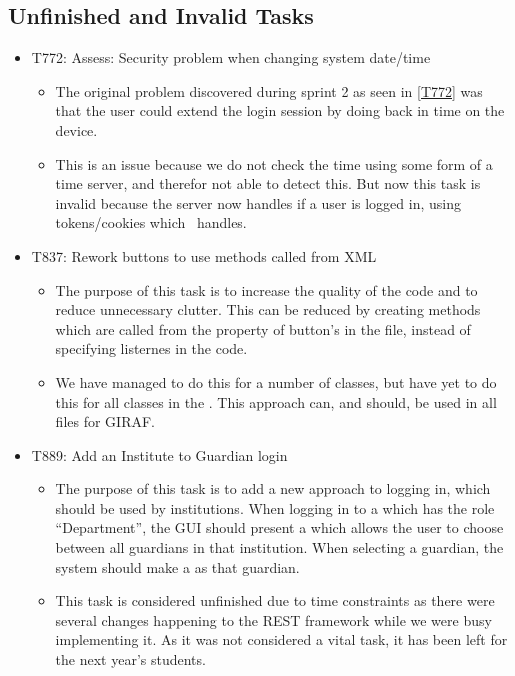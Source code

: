 \subsection{Unfinished and Invalid Tasks}\label{S4Invalid}
\begin{itemize}
  \item T772: Assess: Security problem when changing system date/time
      \begin{itemize}
          \item The original problem discovered during sprint 2 as seen in \autoref{T772}
         was that the user could extend the login session by doing back in time on the
          device.
        \item This is an issue because we do not check the time using some form of a
        time server, and therefor not able to detect this.  
        But now this task is invalid because the server now handles if a user is
        logged in, using tokens/cookies which \rlib\ handles.
        \end{itemize}
  \item T837: Rework buttons to use methods called from XML
    \begin{itemize}
      \item The purpose of this task is to increase the quality of the code and to
      reduce unnecessary clutter. This can be reduced by creating methods which
      are called from the  property of button's in the 
      file, instead of specifying listernes in the code. 
      \item We have managed to
      do this for a number of classes, but have yet to do this for all classes
      in the \lapp. This approach can, and should, be used in all 
      files for GIRAF.
      \end{itemize}
  \item T889: Add an Institute to Guardian login \label{T889}
   \begin{itemize}
     \item The purpose of this task is to add a new approach to logging in,
     which should be used by institutions. When logging in to a  which
     has the role ``Department'', the GUI should present a 
     which allows the user to choose between all guardians in that institution.
     When selecting a guardian, the system should make a  as
     that guardian.
     \item This task is considered unfinished due to time constraints as there
     were several changes happening to the REST framework while we were busy
     implementing it. As it was not considered a vital task, it has been
     left for the next year's students.
   \end{itemize} 
\end{itemize}

